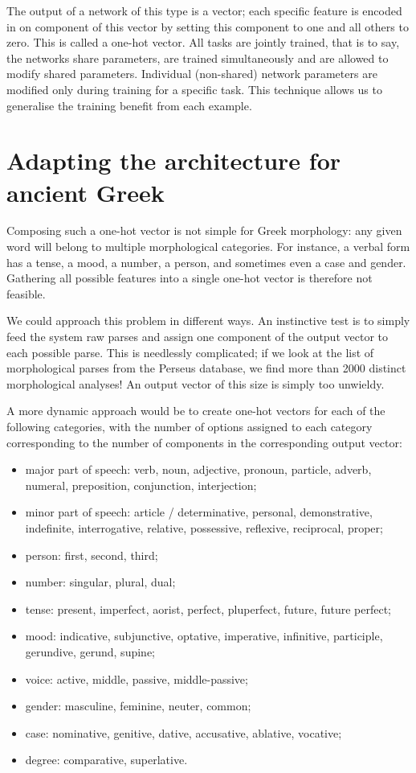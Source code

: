 The output of a network of this type is a vector; each specific
feature is encoded in on component of this vector by setting this
component to one and all others to zero. This is called a one-hot
vector. All tasks are jointly trained, that is to say, the networks
share parameters, are trained simultaneously and are allowed to modify
shared parameters. Individual (non-shared) network parameters are
modified only during training for a specific task. This technique
allows us to generalise the training benefit from each example.

\section{Adapting the architecture for ancient Greek}
\label{sec:adaptation}

Composing such a one-hot vector is not simple for Greek morphology:
any given word will belong to multiple morphological categories. For
instance, a verbal form has a tense, a mood, a number, a person, and
sometimes even a case and gender. Gathering all possible features into a
single one-hot vector is therefore not feasible.

We could approach this problem in different ways. An instinctive test
is to simply feed the system raw parses and assign one component of
the output vector to each possible parse. This is needlessly
complicated; if we look at the list of morphological parses from the
Perseus database, we find more than 2000 distinct morphological
analyses! An output vector of this size is simply too unwieldy.

A more dynamic approach would be to create one-hot vectors for each of
the following categories, with the number of options assigned to each
category corresponding to the number of components in the
corresponding output vector:

\begin{itemize}
\item major part of speech: verb, noun, adjective, pronoun, particle,
  adverb, numeral, preposition, conjunction, interjection;
\item minor part of speech: article / determinative, personal,
  demonstrative, indefinite, interrogative, relative, possessive,
  reflexive, reciprocal, proper;
\item person: first, second, third;
\item number: singular, plural, dual;
\item tense: present, imperfect, aorist, perfect, pluperfect,
  future, future perfect;
\item mood: indicative, subjunctive, optative, imperative,
  infinitive, participle, gerundive, gerund, supine;
\item voice: active, middle, passive, middle-passive;
\item gender: masculine, feminine, neuter, common;
\item case: nominative, genitive, dative, accusative, ablative,
  vocative;
\item degree: comparative, superlative.
\end{itemize}

